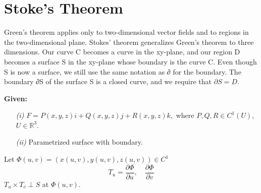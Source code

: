 \documentclass[12pt]{book}
\theoremstyle{definition}
\theoremstyle{remark}
\begin{document}
\section{Stoke's Theorem}
Green's theorem applies only to two-dimensional vector fields and to regions in the two-dimensional plane. Stokes' theorem generalizes Green's theorem to three dimensions. Our curve C
 becomes a curve in the xy-plane, and our region D becomes a surface S in the xy-plane whose boundary is the curve C. Even though S is now a surface, we still use the same notation as ∂ for the boundary. The boundary ∂S of the surface S is a closed curve, and we require that $\partial S = D$.


\noindent \textbf{Given:}  
\begin{enumerate}
  \item[\it (i)] $F = P(x,y,z)i + Q(x,y, z)j + R(x,y,z)k,$ where $P,Q,R \in C^1( U)$, $U \in \mathbb{R}^3$.
  \item[\it (ii)] Parametrized surface with boundary.
\end{enumerate}
Let $\Phi (u,v) = ( x(u,v), y(u,v ), z(u,v))\in C^1$
$$T_u = \frac{\partial {\Phi}}{\partial {u}}, \quad \frac{\partial {\Phi}}{\partial {v}}  $$
$T_u \times T_v \perp S$ at $\Phi(u,v)$. 
\end{document}
